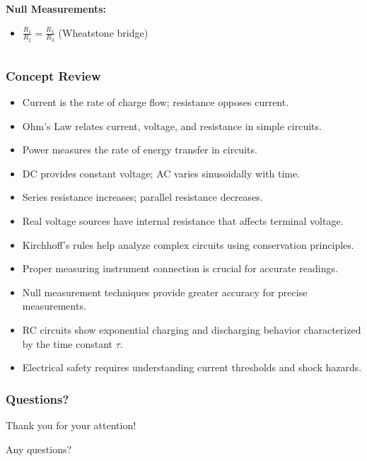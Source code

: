 \documentclass{beamer}
\begin{document}
\begin{frame}
\begin{columns}
\begin{column}{0.5\textwidth}
            \textbf{Null Measurements:}
            \begin{itemize}
                \item $\frac{R_1}{R_2} = \frac{R_x}{R_3}$ (Wheatstone bridge)
            \end{itemize}
        \end{column}
    \end{columns}
\end{frame}

\begin{frame}
    \frametitle{Concept Review}
    \begin{itemize}
        \item Current is the rate of charge flow; resistance opposes current.
        \item Ohm's Law relates current, voltage, and resistance in simple circuits.
        \item Power measures the rate of energy transfer in circuits.
        \item DC provides constant voltage; AC varies sinusoidally with time.
        \item Series resistance increases; parallel resistance decreases.
        \item Real voltage sources have internal resistance that affects terminal voltage.
        \item Kirchhoff's rules help analyze complex circuits using conservation principles.
        \item Proper measuring instrument connection is crucial for accurate readings.
        \item Null measurement techniques provide greater accuracy for precise measurements.
        \item RC circuits show exponential charging and discharging behavior characterized by the time constant $\tau$.
        \item Electrical safety requires understanding current thresholds and shock hazards.
    \end{itemize}
\end{frame}

\begin{frame}
    \frametitle{Questions?}
    \begin{center}
        \Large Thank you for your attention!
        
        \vspace{1cm}
        
        Any questions?
    \end{center}
\end{frame}
\end{document}
